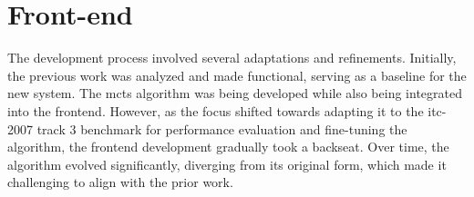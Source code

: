 \section{Front-end}

The development process involved several adaptations and refinements. Initially, the previous work was analyzed and made functional, serving as a baseline for the new system. The \ac{mcts} algorithm was being developed while also being integrated into the frontend. However, as the focus shifted towards adapting it to the \ac{itc-2007} track 3 benchmark for performance evaluation and fine-tuning the algorithm, the frontend development gradually took a backseat. Over time, the algorithm evolved significantly, diverging from its original form, which made it challenging to align with the prior work.

